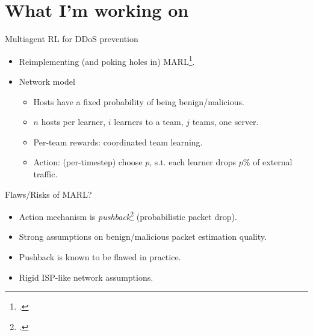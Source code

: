 \documentclass[aspectratio=169,xcolor={dvipsnames}
,hide notes
]{beamer}
\begin{document}
\section{What I'm working on}

\begin{frame}{Multiagent RL for DDoS prevention}
%	
%	
%
	
	\begin{itemize}
		\item Reimplementing (and poking holes in) MARL\footcite{DBLP:journals/eaai/MalialisK15}.
		
		\item Network model
		\begin{itemize}
			\item Hosts have a fixed probability of being benign/malicious.
			\item $n$ hosts per learner, $i$ learners to a team, $j$ teams, one server.
			\item Per-team rewards: \alert{coordinated team learning}.
			\item Action: (per-timestep) choose $p$, s.t. each learner drops $p\%$ of external traffic.
		\end{itemize}
	\end{itemize}
\end{frame}

\begin{frame}{Flaws/Risks of MARL?}	
	\begin{itemize}		
		\item Action mechanism is \emph{pushback}\footcite{DBLP:journals/ccr/MahajanBFIPS02a} (probabilistic packet drop).
		
		\item Strong assumptions on benign/malicious packet estimation quality. 
		\item Pushback is known to be flawed in practice.
		\item Rigid ISP-like network assumptions.
	\end{itemize}
\end{frame}
\end{document}
